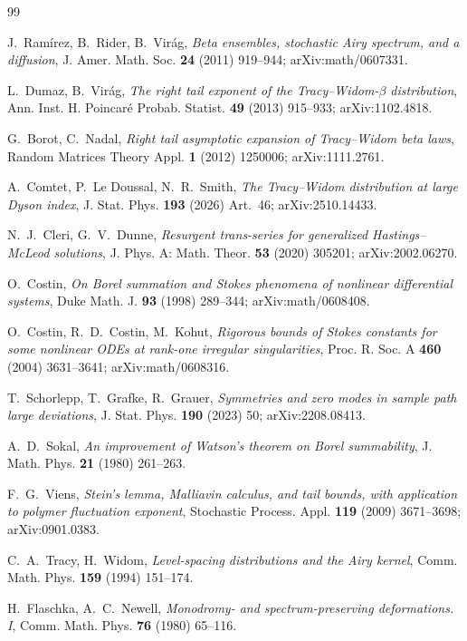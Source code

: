 \documentclass[11pt,reqno]{amsart}
\theoremstyle{plain}
\theoremstyle{definition}
\theoremstyle{remark}
\begin{document}
\begin{thebibliography}{99}

 J.~Ram\'irez, B.~Rider, B.~Vir\'ag, \emph{Beta ensembles, stochastic Airy spectrum,
and a diffusion}, J. Amer. Math. Soc. \textbf{24} (2011) 919--944; arXiv:math/0607331.

 L.~Dumaz, B.~Vir\'ag, \emph{The right tail exponent of the Tracy--Widom-$\beta$
distribution}, Ann. Inst. H. Poincar\'e Probab. Statist. \textbf{49} (2013) 915--933;
arXiv:1102.4818.

 G.~Borot, C.~Nadal, \emph{Right tail asymptotic expansion of Tracy--Widom beta
laws}, Random Matrices Theory Appl. \textbf{1} (2012) 1250006; arXiv:1111.2761.

 A.~Comtet, P.~Le Doussal, N.~R.~Smith, \emph{The Tracy--Widom distribution at large
Dyson index}, J. Stat. Phys. \textbf{193} (2026) Art.~46; arXiv:2510.14433.

 N.~J.~Cleri, G.~V.~Dunne, \emph{Resurgent trans-series for generalized
Hastings--McLeod solutions}, J. Phys. A: Math. Theor. \textbf{53} (2020) 305201; arXiv:2002.06270.

 O.~Costin, \emph{On Borel summation and Stokes phenomena of nonlinear
differential systems}, Duke Math. J. \textbf{93} (1998) 289--344; arXiv:math/0608408.

 O.~Costin, R.~D.~Costin, M.~Kohut, \emph{Rigorous bounds of Stokes constants for some
nonlinear ODEs at rank-one irregular singularities}, Proc. R. Soc. A \textbf{460} (2004)
3631--3641; arXiv:math/0608316.

 T.~Schorlepp, T.~Grafke, R.~Grauer, \emph{Symmetries and zero modes in sample path
large deviations}, J. Stat. Phys. \textbf{190} (2023) 50; arXiv:2208.08413.

 A.~D.~Sokal, \emph{An improvement of Watson's theorem on Borel summability},
J. Math. Phys. \textbf{21} (1980) 261--263.

 F.~G.~Viens, \emph{Stein's lemma, Malliavin calculus, and tail bounds, with
application to polymer fluctuation exponent}, Stochastic Process. Appl. \textbf{119} (2009)
3671--3698; arXiv:0901.0383.

 C.~A.~Tracy, H.~Widom, \emph{Level-spacing distributions and the Airy kernel},
Comm. Math. Phys. \textbf{159} (1994) 151--174.

 H.~Flaschka, A.~C.~Newell, \emph{Monodromy- and spectrum-preserving deformations.
I}, Comm. Math. Phys. \textbf{76} (1980) 65--116.


\end{thebibliography}
\end{document}
